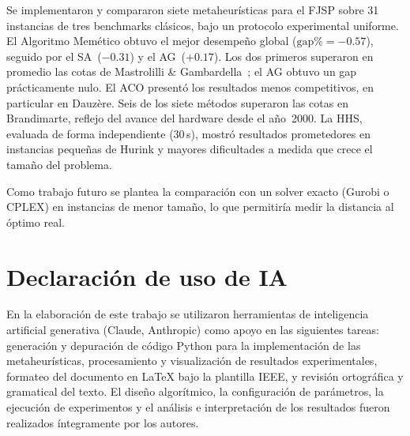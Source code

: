\documentclass[conference]{IEEEtran}
\begin{document}
Se implementaron y compararon siete metaheur\'isticas para el FJSP
sobre 31 instancias de tres benchmarks cl\'asicos, bajo un protocolo
experimental uniforme.
El Algoritmo Mem\'etico obtuvo el mejor desempe\~no global
($\text{gap\%} = -0.57$), seguido por el SA~($-0.31$) y el
AG~($+0.17$).
Los dos primeros superaron en promedio las cotas de
Mastrolilli \& Gambardella~\cite{mastrolilli2000}; el AG obtuvo
un gap pr\'acticamente nulo.
El ACO present\'o los resultados menos competitivos, en particular
en Dauz\`ere.
Seis de los siete m\'etodos superaron las cotas en Brandimarte,
reflejo del avance del hardware desde el a\~no~2000.
La HHS, evaluada de forma independiente (30\,s), mostr\'o resultados
prometedores en instancias peque\~nas de Hurink y mayores
dificultades a medida que crece el tama\~no del problema.

Como trabajo futuro se plantea la comparaci\'on con un solver exacto
(Gurobi o CPLEX) en instancias de menor tama\~no, lo que permitir\'ia
medir la distancia al \'optimo real.

\section*{Declaraci\'on de uso de IA}

En la elaboraci\'on de este trabajo se utilizaron herramientas de
inteligencia artificial generativa (Claude, Anthropic) como apoyo
en las siguientes tareas: generaci\'on y depuraci\'on de c\'odigo
Python para la implementaci\'on de las metaheur\'isticas,
procesamiento y visualizaci\'on de resultados experimentales,
formateo del documento en \LaTeX{} bajo la plantilla IEEE, y
revisi\'on ortogr\'afica y gramatical del texto.
El dise\~no algor\'itmico, la configuraci\'on de par\'ametros, la
ejecuci\'on de experimentos y el an\'alisis e interpretaci\'on de
los resultados fueron realizados \'integramente por los autores.
\end{document}
